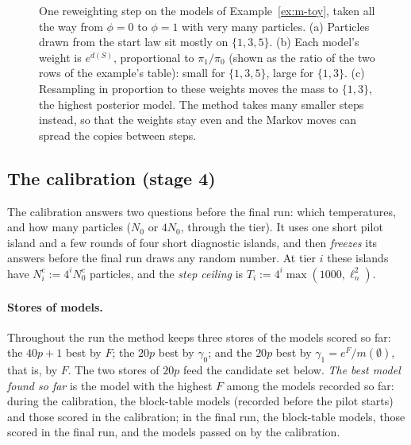 \documentclass[11pt]{article}
\newcommand{\Nc}{N^{\mathrm c}}   %
\begin{document}
\begin{figure}[ht]
\centering
{}
\caption{One reweighting step on the models of Example~\ref{ex:m-toy}, taken all the way from $\phi=0$ to $\phi=1$ with
very many particles. (a) Particles drawn from the start law sit mostly on $\{1,3,5\}$. (b) Each model's weight is
$e^{d(S)}$, proportional to $\pi_1/\pi_0$ (shown as the ratio of the two rows of the example's table): small for
$\{1,3,5\}$, large for $\{1,3\}$. (c) Resampling in proportion to these weights moves the mass to $\{1,3\}$, the highest
posterior model. The method takes many smaller steps instead, so that the weights stay even and the Markov
moves can spread the copies between steps.}
\label{fig:m-step}
\end{figure}

\subsection{The calibration (stage 4)}\label{sec:m-calibration}

The calibration answers two questions before the final run: which temperatures, and how many particles ($N_0$ or $4N_0$,
through the tier). It uses one short pilot island and a few rounds of four short diagnostic islands, and then
\emph{freezes} its answers before the final run draws any random number. At tier $i$ these islands have
$\Nc_i:=4^i\Nc_0$ particles, and the \emph{step ceiling} is $T_i:=4^i\max(1000,\ell_n^2)$.

\paragraph{Stores of models.} Throughout the run the method keeps three stores of the models scored so far: the $40p+1$
best by $F$; the $20p$ best by $\gamma_0$; and the $20p$ best by $\gamma_1=e^{F}/m(\emptyset)$, that is, by $F$. The two
stores of $20p$ feed the candidate set below. \emph{The best model found so far} is the model with the highest $F$ among
the models recorded so far: during the calibration, the block-table models (recorded before the pilot starts) and those
scored in the calibration; in the final run, the block-table models, those scored in the final run, and the models passed
on by the calibration.
\end{document}
